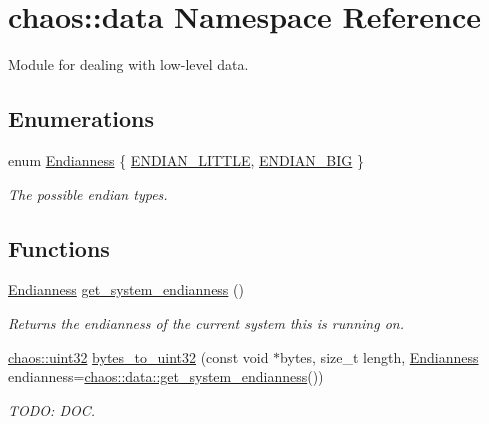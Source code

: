 \hypertarget{namespacechaos_1_1data}{}\section{chaos\+:\+:data Namespace Reference}
\label{namespacechaos_1_1data}


Module for dealing with low-\/level data.  


\subsection*{Enumerations}
\begin{DoxyCompactItemize}
\item 
enum \hyperlink{namespacechaos_1_1data_adb2657d50c0b84cdc1153001031bbf3f}{Endianness} \{ \hyperlink{namespacechaos_1_1data_adb2657d50c0b84cdc1153001031bbf3fa7fc5455bb6147c278dfa4a84e255c66d}{E\+N\+D\+I\+A\+N\+\_\+\+L\+I\+T\+T\+L\+E}, 
\hyperlink{namespacechaos_1_1data_adb2657d50c0b84cdc1153001031bbf3fa0e1ed99b965cedefe24534be309738ad}{E\+N\+D\+I\+A\+N\+\_\+\+B\+I\+G}
 \}\begin{DoxyCompactList}\small\item\em The possible endian types. \end{DoxyCompactList}
\end{DoxyCompactItemize}
\subsection*{Functions}
\begin{DoxyCompactItemize}
\item 
\hypertarget{namespacechaos_1_1data_a853118d28d026784faad6673bbcf526f}{}\hyperlink{namespacechaos_1_1data_adb2657d50c0b84cdc1153001031bbf3f}{Endianness} \hyperlink{namespacechaos_1_1data_a853118d28d026784faad6673bbcf526f}{get\+\_\+system\+\_\+endianness} ()\label{namespacechaos_1_1data_a853118d28d026784faad6673bbcf526f}

\begin{DoxyCompactList}\small\item\em Returns the endianness of the current system this is running on. \end{DoxyCompactList}\item 
\hypertarget{namespacechaos_1_1data_acb302083553072deedf6162f524113e2}{}\hyperlink{namespacechaos_a3b3a47ba1e284655bf1a30c441121c60}{chaos\+::uint32} \hyperlink{namespacechaos_1_1data_acb302083553072deedf6162f524113e2}{bytes\+\_\+to\+\_\+uint32} (const void $\ast$bytes, size\+\_\+t length, \hyperlink{namespacechaos_1_1data_adb2657d50c0b84cdc1153001031bbf3f}{Endianness} endianness=\hyperlink{namespacechaos_1_1data_a853118d28d026784faad6673bbcf526f}{chaos\+::data\+::get\+\_\+system\+\_\+endianness}())\label{namespacechaos_1_1data_acb302083553072deedf6162f524113e2}

\begin{DoxyCompactList}\small\item\em T\+O\+D\+O\+: D\+O\+C. \end{DoxyCompactList}\end{DoxyCompactItemize}


